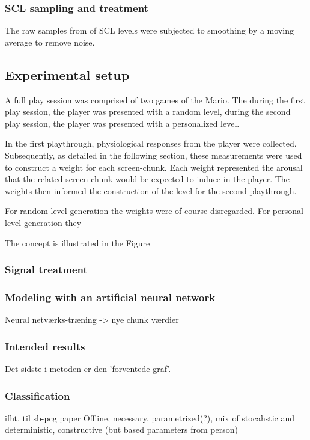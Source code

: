 \documentclass{llncs}
\begin{document}
\subsubsection{SCL sampling and treatment}
The raw samples from of SCL levels were subjected to smoothing by a moving average to remove noise.

\subsection{Experimental setup}

A full play session was comprised of two games of the Mario. The during the first play session, the player was presented with a random level, during the second play session, the player was presented with a personalized level.

In the first playthrough, physiological responses from the player were collected.
Subsequently, as detailed in the following section, these measurements were used to construct a weight for each screen-chunk.
Each weight represented the arousal that the related screen-chunk would be expected to induce in the player.
The weights then informed the construction of the level for the second playthrough.




For random level generation the weights were of course disregarded. For personal level generation they 



The concept is illustrated in the Figure %




\subsubsection{Signal treatment}

\subsubsection{Modeling with an artificial neural network}
Neural netværks-træning -> nye chunk værdier

\subsubsection{Intended results}

Det sidste i metoden er den 'forventede graf'.



\subsubsection{Classification}
ifht. til sb-pcg paper
Offline, necessary, parametrized(?), mix of stocahstic and deterministic, constructive (but based parameters from person)
\end{document}

